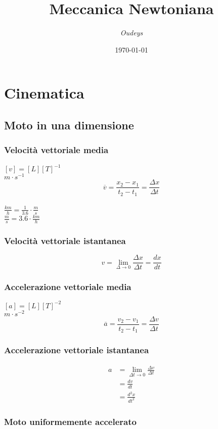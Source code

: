 \documentclass[a4paper,12pt]{article}
\title{\textbf{Meccanica Newtoniana}}
\author{\textit{Oudeys}}
\date{\today}
\theoremstyle{mystyle}
\begin{document}
\maketitle


\tableofcontents
\newpage


\section{Cinematica}
\subsection{Moto in una dimensione}
\subsubsection{Velocità vettoriale media}
\([v]=[L][T]^{-1}\)\\
\(m \cdot s^{-1}\)\\
\[\overline v = \frac{x_2-x_1}{t_2-t_1} = \frac{\Delta x}{\Delta t}\]\\
\(\frac{km}{h}=  \frac{1}{3.6} \cdot \frac{m}{s}\)\\
\( \frac{m}{s} = 3.6 \cdot  \frac{km}{h}\)
\subsubsection{Velocità vettoriale istantanea}
\[v = \lim_{\Delta \rightarrow 0} \frac{\Delta x}{\Delta t} = \frac{dx}{dt}\]
\subsubsection{Accelerazione vettoriale media}
\([a]=[L][T]^{-2}\)\\
\(m \cdot s^{-2}\)\\
\[\overline a = \frac{v_2-v_1}{t_2-t_1} = \frac{\Delta v}{\Delta t}\]



\subsubsection{Accelerazione vettoriale istantanea}
\[\begin{aligned}
    a &= \lim_{\Delta t \rightarrow 0} \frac{\Delta v}{\Delta t} \\
    &= \frac{dv}{dt}\\
    &= \frac{d^2x}{dt^2}
\end{aligned}\]
\subsubsection{Moto uniformemente accelerato}
\end{document}
